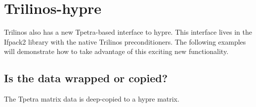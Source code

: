 \section{Trilinos-hypre}
Trilinos also has a new Tpetra-based interface to hypre.  This interface lives
in the Ifpack2 library with the native Trilinos preconditioners.  The following
examples will demonstrate how to take advantage of this exciting new
functionality.





\subsection{Is the data wrapped or copied?}
The Tpetra matrix data is deep-copied to a hypre matrix.